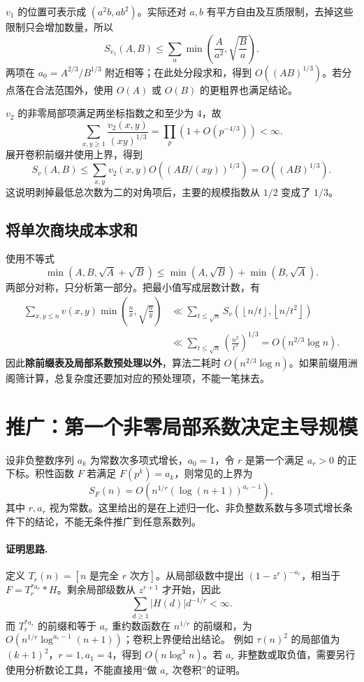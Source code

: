 \documentclass[UTF8,a4paper,11pt,oneside,openany,fontset=fandol]{ctexbook}
\theoremstyle{definition}
\newcommand{\floor}[1]{\left\lfloor #1\right\rfloor}
\begin{document}
$v_1$ 的位置可表示成 $(a^2b,ab^2)$。实际还对 $a,b$ 有平方自由及互质限制，去掉这些限制只会增加数量，所以
\[
 S_{v_1}(A,B)\le\sum_a\min\left(\frac A{a^2},\sqrt{\frac Ba}\right).
\]
两项在 $a_0=A^{2/3}/B^{1/3}$ 附近相等；在此处分段求和，得到 $O((AB)^{1/3})$。若分点落在合法范围外，使用 $O(A)$ 或 $O(B)$ 的更粗界也满足结论。

$v_2$ 的非零局部项满足两坐标指数之和至少为 $4$，故
\[
 \sum_{x,y\ge1}\frac{v_2(x,y)}{(xy)^{1/3}}
 =\prod_p\left(1+O(p^{-4/3})\right)<\infty.
\]
展开卷积前缀并使用上界，得到
\[
 S_v(A,B)\le\sum_{x,y}v_2(x,y)
 O\!\left((AB/(xy))^{1/3}\right)=O((AB)^{1/3}).
\]
这说明剥掉最低总次数为二的对角项后，主要的规模指数从 $1/2$ 变成了 $1/3$。

\subsection{将单次商块成本求和}
使用不等式
\[
 \min(A,B,\sqrt A+\sqrt B)
 \le\min(A,\sqrt B)+\min(B,\sqrt A).
\]
两部分对称，只分析第一部分。把最小值写成层数计数，有
\[
\begin{aligned}
 \sum_{x,y\le n}v(x,y)\min\left(\frac nx,\sqrt{\frac ny}\right)
 &\ll\sum_{t\le\sqrt n}S_v(\floor{n/t},\floor{n/t^2})\\
 &\ll\sum_{t\le\sqrt n}\left(\frac{n^2}{t^3}\right)^{1/3}
 =O(n^{2/3}\log n).
\end{aligned}
\]
因此\textbf{除前缀表及局部系数预处理以外}，算法二耗时 $O(n^{2/3}\log n)$。如果前缀用洲阁筛计算，总复杂度还要加对应的预处理项，不能一笔抹去。


\section{推广：第一个非零局部系数决定主导规模}
设非负整数序列 $a_k$ 为常数次多项式增长，$a_0=1$，令 $r$ 是第一个满足 $a_r>0$ 的正下标。积性函数 $F$ 若满足 $F(p^k)=a_k$，则常见的上界为
\[
 S_F(n)=O\left(n^{1/r}(\log(n+1))^{a_r-1}\right),
\]
其中 $r,a_r$ 视为常数。这里给出的是在上述归一化、非负整数系数与多项式增长条件下的结论，不能无条件推广到任意系数列。

\paragraph{证明思路.} 定义 $T_r(n)=[n\text{ 是完全 }r\text{ 次方}]$。从局部级数中提出 $(1-z^r)^{-a_r}$，相当于 $F=T_r^{*a_r}*H$。剩余局部级数从 $z^{r+1}$ 才开始，因此
\[
 \sum_{d\ge1}|H(d)|d^{-1/r}<\infty.
\]
而 $T_r^{*a_r}$ 的前缀和等于 $a_r$ 重约数函数在 $n^{1/r}$ 的前缀和，为 $O(n^{1/r}\log^{a_r-1}(n+1))$；卷积上界便给出结论。
例如 $\tau(n)^2$ 的局部值为 $(k+1)^2$，$r=1,a_1=4$，得到 $O(n\log^3 n)$。若 $a_r$ 非整数或取负值，需要另行使用分析数论工具，不能直接用“做 $a_r$ 次卷积”的证明。
\end{document}
